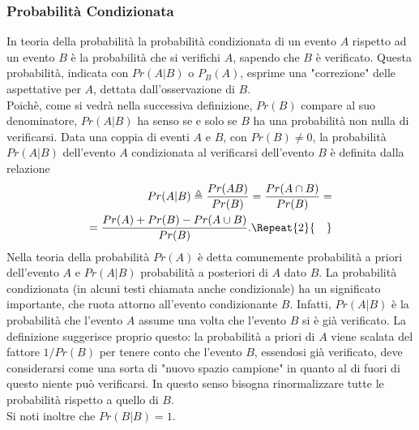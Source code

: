 \documentclass[12pt,oneside,openany]{memoir}
\numberwithin{equation}{subsection}
\newcommand{\quads}[1]{\Repeat{#1}{\quad}}
\begin{document}
\subsubsection{Probabilit\`a Condizionata}
In teoria della probabilit\`a la probabilit\`a condizionata di un evento $A$
rispetto ad un evento $B$ \`e la probabilit\`a che si verifichi $A$, sapendo che
$B$ \`e verificato. Questa probabilit\`a, indicata con $Pr(A | B)$ o $P_{B}(A)$,
esprime una "correzione" delle aspettative per $A$, dettata dall'osservazione di
$B$.\\
Poich\`e, come si vedr\`a nella successiva definizione, $Pr(B)$ compare al
suo denominatore, $Pr(A | B)$ ha senso se e solo se $B$ ha una probabilit\`a non
nulla di verificarsi.
\bigbreak
Data una coppia di eventi $A$ e $B$, con $Pr(B) \neq 0$, la probabilit\`a
$Pr(A|B)$ dell'evento $A$ condizionata al verificarsi dell'evento $B$ \`e
definita dalla relazione
\begin{equation}
    \begin{split}
        Pr(A | B) \triangleq \frac{Pr(AB)}{Pr(B)} = \frac{Pr(A \cap B)}{Pr(B)} =
        \\
        = \frac{Pr(A) + Pr(B) - Pr(A \cup B)}{Pr(B)}.
        \quads{2}
    \end{split}
\end{equation}
\bigbreak
Nella teoria della probabilit\`a $Pr(A)$ \`e detta comunemente probabilit\`a a
priori dell'evento $A$ e $Pr(A | B)$ probabilit\`a a posteriori di $A$ dato $B$.
La probabilit\`a condizionata (in alcuni testi chiamata anche condizionale) ha
un significato importante, che ruota attorno all'evento condizionante $B$.
Infatti, $Pr(A | B)$ \`e la probabilit\`a che l'evento $A$ assume una volta che
l'evento $B$ si \`e gi\`a verificato. La definizione suggerisce proprio questo:
la probabilit\`a a priori di $A$ viene scalata del fattore $1/Pr(B)$ per tenere
conto che l'evento $B$, essendosi gi\`a verificato, deve considerarsi come una
sorta di "nuovo spazio campione" in quanto al di fuori di questo niente pu\`o
verificarsi. In questo senso bisogna rinormalizzare tutte le probabilit\`a
rispetto a quello di $B$.\\
Si noti inoltre che $Pr(B | B) = 1$.

\end{document}
